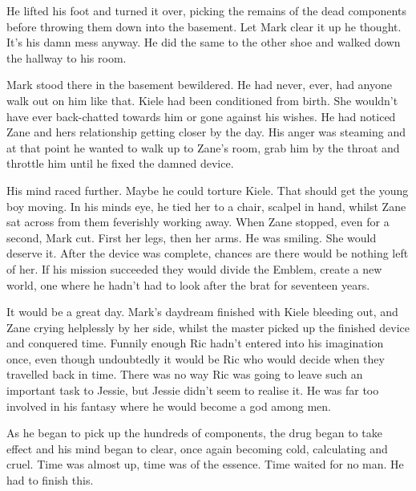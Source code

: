 He lifted his foot and turned it over, picking the remains of the dead components before throwing them down into the basement.  Let Mark clear it up he thought.  It's his damn mess anyway.  He did the same to the other shoe and walked down the hallway to his room.

Mark stood there in the basement bewildered.  He had never, ever, had anyone walk out on him like that.  Kiele had been conditioned from birth.  She wouldn't have ever back-chatted towards him or gone against his wishes.  He had noticed Zane and hers  relationship getting closer by the day.  His anger was steaming and at that point he wanted to walk up to Zane's room, grab him by the throat and throttle him until he fixed the damned device.  

His mind raced further.  Maybe he could torture Kiele.  That should get the young boy moving.  In his minds eye, he tied her to a chair, scalpel in hand, whilst Zane sat across from them feverishly working away.  When Zane stopped, even for a second, Mark cut.  First her legs, then her arms.  He was smiling.  She would deserve it.  After the device was complete, chances are there would be nothing left of her.  If his mission succeeded they would divide the Emblem, create a new world, one where he hadn't had to look after the brat for seventeen years.

It would be a great day.  Mark's daydream finished with Kiele bleeding out, and Zane crying helplessly by her side, whilst the master picked up the finished device and conquered time.  Funnily enough Ric hadn't entered into his imagination once, even though undoubtedly it would be Ric who would decide when they travelled back in time.  There was no way Ric was going to leave such an important task to Jessie, but Jessie didn't seem to realise it.   He was far too involved in his fantasy where he would become a god among men.

As he began to pick up the hundreds of components, the drug began to take effect and his mind began to clear, once again becoming cold, calculating and cruel.  Time was almost up, time was of the essence.  Time waited for no man.  He had to finish this.  







